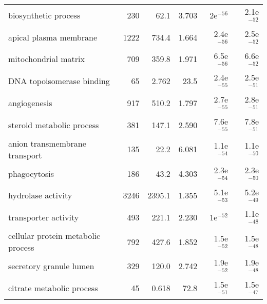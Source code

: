 \begin{longtable}{lrrrrr}
                              biosynthetic process &                     230 &                    62.1 &      3.703 &           2e$^{-56}$ &         2.1e$^{-52}$ \\
                            apical plasma membrane &                    1222 &                   734.4 &      1.664 &         2.4e$^{-56}$ &         2.5e$^{-52}$ \\
                              mitochondrial matrix &                     709 &                   359.8 &      1.971 &         6.5e$^{-56}$ &         6.6e$^{-52}$ \\
                         DNA topoisomerase binding &                      65 &                   2.762 &       23.5 &         2.4e$^{-55}$ &         2.5e$^{-51}$ \\
                                      angiogenesis &                     917 &                   510.2 &      1.797 &         2.7e$^{-55}$ &         2.8e$^{-51}$ \\
                         steroid metabolic process &                     381 &                   147.1 &      2.590 &         7.6e$^{-55}$ &         7.8e$^{-51}$ \\
                     anion transmembrane transport &                     135 &                    22.2 &      6.081 &         1.1e$^{-54}$ &         1.1e$^{-50}$ \\
                                      phagocytosis &                     186 &                    43.2 &      4.303 &         2.3e$^{-54}$ &         2.3e$^{-50}$ \\
                                hydrolase activity &                    3246 &                  2395.1 &      1.355 &         5.1e$^{-53}$ &         5.2e$^{-49}$ \\
                              transporter activity &                     493 &                   221.1 &      2.230 &           1e$^{-52}$ &         1.1e$^{-48}$ \\
                cellular protein metabolic process &                     792 &                   427.6 &      1.852 &         1.5e$^{-52}$ &         1.5e$^{-48}$ \\
                           secretory granule lumen &                     329 &                   120.0 &      2.742 &         1.9e$^{-52}$ &         1.9e$^{-48}$ \\
                         citrate metabolic process &                      45 &                   0.618 &       72.8 &         1.5e$^{-51}$ &         1.5e$^{-47}$ \\

\end{longtable}

